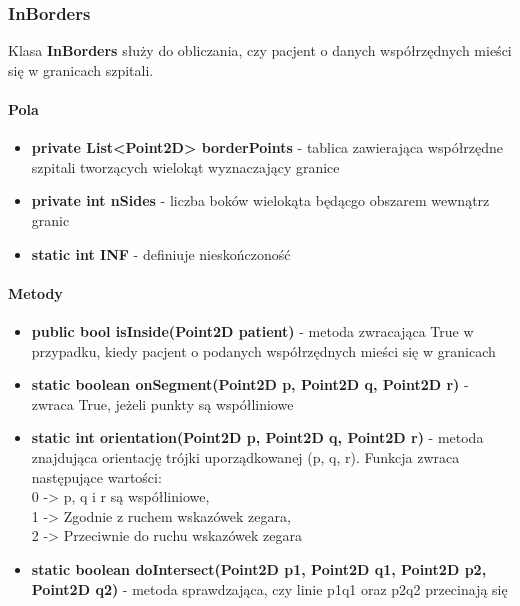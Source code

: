 \documentclass[]{article}
\begin{document}
                
                \subsubsection{InBorders}
                Klasa \textbf{InBorders} służy do obliczania, czy pacjent o danych współrzędnych mieści się w granicach szpitali.
                \paragraph{Pola}
                    \begin{itemize}
                        \item\textbf{private List<Point2D> borderPoints} - tablica zawierająca współrzędne szpitali tworzących wielokąt wyznaczający granice
                        \item\textbf{private int nSides} - liczba boków wielokąta będącgo obszarem wewnątrz granic
                        \item \textbf{static int INF} - definiuje nieskończoność 
                    \end{itemize}
                \paragraph{Metody}
                    \begin{itemize}
                        \item\textbf{public bool isInside(Point2D patient)} - metoda zwracająca True w przypadku, kiedy pacjent o podanych współrzędnych mieści się w granicach
                        \item\textbf{static boolean onSegment(Point2D p, Point2D q, Point2D r)} - zwraca True, jeżeli punkty są współliniowe
                        \item\textbf{static int orientation(Point2D p, Point2D q, Point2D r)} - metoda znajdująca orientację trójki uporządkowanej (p, q, r). Funkcja zwraca następujące wartości:\\
                        0 -> p, q i r są współliniowe,\\
                        1 -> Zgodnie z ruchem wskazówek zegara,\\
                        2 -> Przeciwnie do ruchu wskazówek zegara
                        \item \textbf{static boolean doIntersect(Point2D p1, Point2D q1,
                               Point2D p2, Point2D q2)} - metoda sprawdzająca, czy linie p1q1 oraz p2q2 przecinają się
                    \end{itemize}
        
\end{document}
